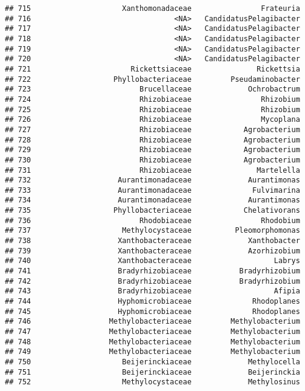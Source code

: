 \documentclass[
]{article}
\begin{document}
\begin{verbatim}
## 715                     Xanthomonadaceae                Frateuria
## 716                                 <NA>   CandidatusPelagibacter
## 717                                 <NA>   CandidatusPelagibacter
## 718                                 <NA>   CandidatusPelagibacter
## 719                                 <NA>   CandidatusPelagibacter
## 720                                 <NA>   CandidatusPelagibacter
## 721                       Rickettsiaceae               Rickettsia
## 722                   Phyllobacteriaceae         Pseudaminobacter
## 723                         Brucellaceae             Ochrobactrum
## 724                         Rhizobiaceae                Rhizobium
## 725                         Rhizobiaceae                Rhizobium
## 726                         Rhizobiaceae                Mycoplana
## 727                         Rhizobiaceae            Agrobacterium
## 728                         Rhizobiaceae            Agrobacterium
## 729                         Rhizobiaceae            Agrobacterium
## 730                         Rhizobiaceae            Agrobacterium
## 731                         Rhizobiaceae               Martelella
## 732                    Aurantimonadaceae             Aurantimonas
## 733                    Aurantimonadaceae              Fulvimarina
## 734                    Aurantimonadaceae             Aurantimonas
## 735                   Phyllobacteriaceae            Chelativorans
## 736                         Rhodobiaceae                Rhodobium
## 737                     Methylocystaceae          Pleomorphomonas
## 738                    Xanthobacteraceae             Xanthobacter
## 739                    Xanthobacteraceae             Azorhizobium
## 740                    Xanthobacteraceae                   Labrys
## 741                    Bradyrhizobiaceae           Bradyrhizobium
## 742                    Bradyrhizobiaceae           Bradyrhizobium
## 743                    Bradyrhizobiaceae                   Afipia
## 744                    Hyphomicrobiaceae              Rhodoplanes
## 745                    Hyphomicrobiaceae              Rhodoplanes
## 746                  Methylobacteriaceae         Methylobacterium
## 747                  Methylobacteriaceae         Methylobacterium
## 748                  Methylobacteriaceae         Methylobacterium
## 749                  Methylobacteriaceae         Methylobacterium
## 750                     Beijerinckiaceae             Methylocella
## 751                     Beijerinckiaceae             Beijerinckia
## 752                     Methylocystaceae             Methylosinus

\end{verbatim}
\end{document}
